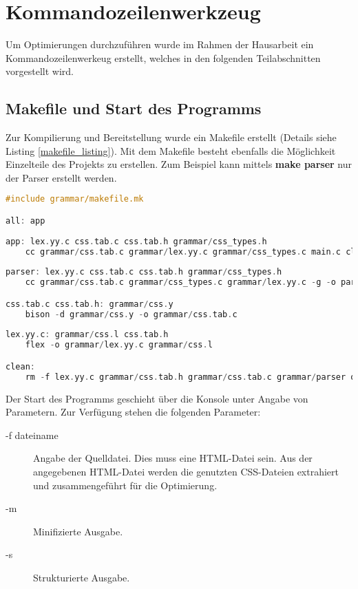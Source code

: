 \section{Kommandozeilenwerkzeug}
Um Optimierungen durchzuführen wurde im Rahmen der Hausarbeit ein Kommandozeilenwerkeug erstellt, welches in den folgenden Teilabschnitten vorgestellt wird.

\subsection{Makefile und Start des Programms}
Zur Kompilierung und Bereitstellung wurde ein Makefile erstellt (Details siehe Listing \ref{makefile_listing}). Mit dem Makefile besteht ebenfalls die Möglichkeit Einzelteile des Projekts zu erstellen. Zum Beispiel kann mittels \textbf{make parser} nur der Parser erstellt werden.

\begin{lstlisting}[label=makefile_listing,language=C, caption=Makefile]
#include grammar/makefile.mk

all: app
	
app: lex.yy.c css.tab.c css.tab.h grammar/css_types.h
	cc grammar/css.tab.c grammar/lex.yy.c grammar/css_types.c main.c cli_parse.c css_merge.c optimizer.c output.c -o optimCSS
	
parser: lex.yy.c css.tab.c css.tab.h grammar/css_types.h
	cc grammar/css.tab.c grammar/css_types.c grammar/lex.yy.c -g -o parser

css.tab.c css.tab.h: grammar/css.y
	bison -d grammar/css.y -o grammar/css.tab.c
            
lex.yy.c: grammar/css.l css.tab.h
	flex -o grammar/lex.yy.c grammar/css.l

clean: 
	rm -f lex.yy.c grammar/css.tab.h grammar/css.tab.c grammar/parser optimCSS

\end{lstlisting}

Der Start des Programms geschieht über die Konsole unter Angabe von Parametern. Zur Verfügung stehen die folgenden Parameter:

\begin{description}
   \item[ -f dateiname] Angabe der Quelldatei. Dies muss eine HTML-Datei sein. Aus der angegebenen HTML-Datei werden die genutzten CSS-Dateien extrahiert und zusammengeführt für die Optimierung.
   \item[ -m] Minifizierte Ausgabe.
   \item[ -s] Strukturierte Ausgabe.
\end{description}

